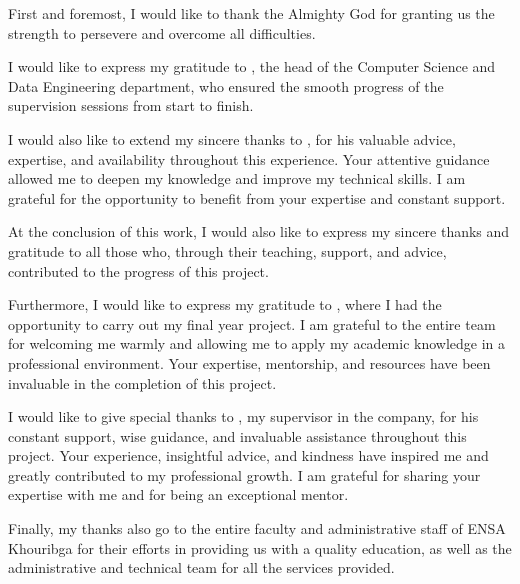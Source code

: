 \remerciements

First and foremost, I would like to thank the Almighty God for granting us the strength to persevere and overcome all difficulties.

\medskip

I would like to express my gratitude to \textbf{}, the head of the Computer Science and Data Engineering department, who ensured the smooth progress of the supervision sessions from start to finish.

\medskip

I would also like to extend my sincere thanks to \textbf{}, for his valuable advice, expertise, and availability throughout this experience. Your attentive guidance allowed me to deepen my knowledge and improve my technical skills. I am grateful for the opportunity to benefit from your expertise and constant support.

\medskip

At the conclusion of this work, I would also like to express my sincere thanks and gratitude to all those who, through their teaching, support, and advice, contributed to the progress of this project.

\medskip

Furthermore, I would like to express my gratitude to \textbf{}, where I had the opportunity to carry out my final year project. I am grateful to the entire \textbf{} team for welcoming me warmly and allowing me to apply my academic knowledge in a professional environment. Your expertise, mentorship, and resources have been invaluable in the completion of this project.

\medskip

I would like to give special thanks to \textbf{}, my supervisor in the company, for his constant support, wise guidance, and invaluable assistance throughout this project. Your experience, insightful advice, and kindness have inspired me and greatly contributed to my professional growth. I am grateful for sharing your expertise with me and for being an exceptional mentor.

\medskip

Finally, my thanks also go to the entire faculty and administrative staff of ENSA Khouribga for their efforts in providing us with a quality education, as well as the administrative and technical team for all the services provided.